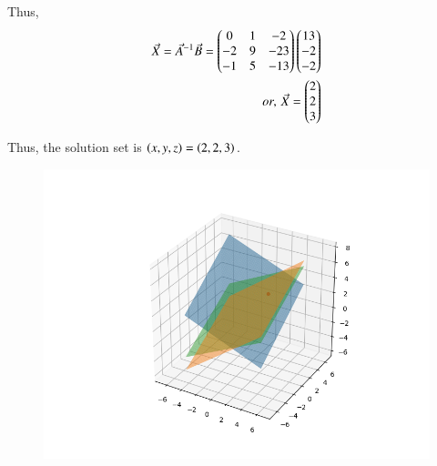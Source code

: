 \documentclass[journal]{IEEEtran}
\begin{document}
Thus,
\begin{align}
\Vec{X}=\Vec{A}^{-1}\Vec{B}=\begin{pmatrix}0 & 1 & -2 \\ -2 & 9 & -23 \\ -1 & 5 & -13\end{pmatrix}\begin{pmatrix}13 \\ -2 \\ -2\end{pmatrix} \\
or, \, \Vec{X}=\begin{pmatrix}2 \\ 2 \\ 3\end{pmatrix}
\end{align}

Thus, the solution set is $\left(x,y,z\right)=\left(2,2,3\right)$.

\begin{figure}[H]
\centering
\includegraphics[width=0.8\columnwidth]{figs/img.png}
\caption*{}
\end{figure}
\end{document}

